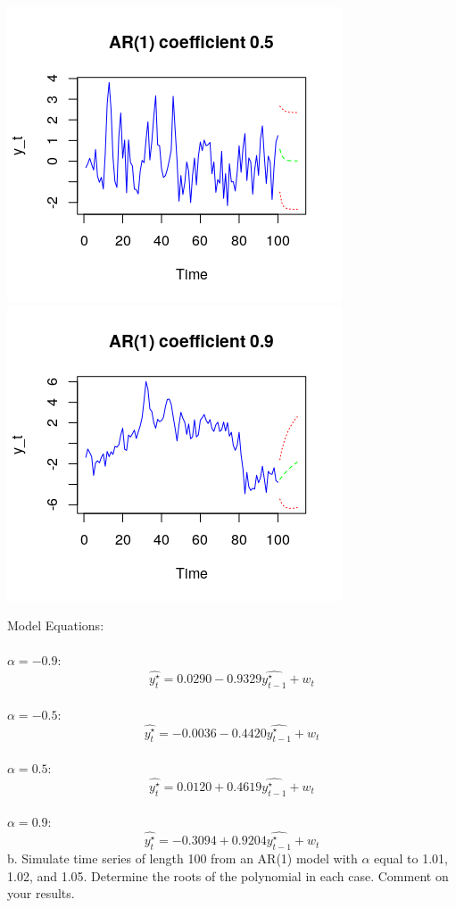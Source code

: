 \documentclass[11pt]{article}
\begin{document}
\begin{center}
\includegraphics[scale=1]{1a3}
\includegraphics[scale=1]{1a4}
\end{center}
Model Equations:\\\\
$\alpha = -0.9$:
$$ \hat{y_t^\star} = 0.0290 -0.9329\hat{y_{t-1}^\star} + w_t $$
\\
$\alpha = -0.5$:
$$ \hat{y_t^\star} = -0.0036 - 0.4420\hat{y_{t-1}^\star} + w_t$$
\\
$\alpha = 0.5$:
$$ \hat{y_t^\star} = 0.0120 + 0.4619\hat{y_{t-1}^\star} + w_t $$
\\
$\alpha = 0.9$:
$$ \hat{y_t^\star} = -0.3094 + 0.9204\hat{y_{t-1}^\star} + w_t $$
b. Simulate time series of length 100 from an AR(1) model with $\alpha$ equal to 1.01, 1.02, and 1.05. Determine the roots of the polynomial in each case. Comment on your results.
\\\\
\end{document}
